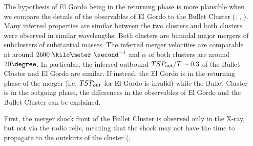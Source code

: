\documentclass[ucdthesis.tex]{subfiles}
\begin{document}
    The hypothesis of El Gordo being in the returning phase is more plausible when
    we compare the details of the observables of El Gordo to the Bullet
    Cluster (\citealt{Bradac2006b}, \citealt{Springel2007},
    \citealt{Mastropietro2008a}).
    Many inferred properties are similar between the two clusters and
    both clusters were observed in similar wavelengths. Both clusters are
    bimodal major mergers of subclusters of substantial masses. The inferred
    merger velocities are comparable at around $2600~\kilo\meter~\second^{-1}$
    and $\alpha$ of both clusters are around $20 \degree$. 
    In particular, the inferred outbound $TSP_{\rm out} / T \sim 0.3$ of the Bullet Cluster and El Gordo
    are similar. If instead, the El Gordo
    is in the returning phase of the merger (i.e. $TSP_{\rm out}$ for El Gordo is
    invalid) while the Bullet Cluster is in the outgoing phase, the differences
    in the observables of El Gordo and the Bullet Cluster can be explained.\par
    First, the merger shock front of the Bullet Cluster is
    observed only in the X-ray, but not via the radio relic, meaning that the shock may not have the
    time to propagate to the outskirts of the cluster (\citealt{Bruggen2011},
\end{document}
